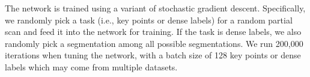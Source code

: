 \documentclass[10pt,twocolumn,letterpaper]{article}
\begin{document}

 The network is trained using a variant of stochastic gradient descent. Specifically, we randomly pick a task (i.e., key points or dense labels) for a random partial scan and feed it into the network for training. If the task is dense labels, we also randomly pick a segmentation among all possible segmentations. We run 200,000 iterations when tuning the network, with a batch size of 128 key points or dense labels which may come from multiple datasets.
\end{document}
